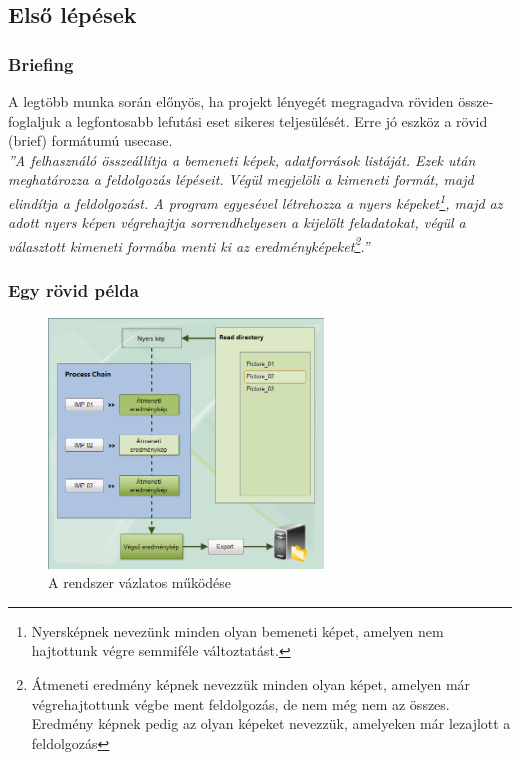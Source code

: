 \documentclass[a4paper,12pt,oneside]{report}
\begin{document}
\subsection{Első lépések}
\subsubsection{Briefing}
A legtöbb munka során előnyös, ha projekt lényegét megragadva röviden össze-foglaljuk a legfontosabb lefutási eset sikeres teljesülését. Erre jó eszköz a rövid (brief\cite{book:usecase_book_brief}) formátumú usecase.
\\\emph{''A felhasználó összeállítja a bemeneti képek, adatforrások listáját. Ezek után meghatározza a feldolgozás lépéseit. Végül megjelöli a kimeneti formát, majd elindítja a feldolgozást. A program egyesével létrehozza a nyers képeket\footnote{Nyersképnek nevezünk minden olyan bemeneti képet, amelyen nem hajtottunk végre semmiféle változtatást.}, majd az adott nyers képen végrehajtja sorrendhelyesen a kijelölt feladatokat, végül a választott kimeneti formába menti ki az eredményképeket\footnote{Átmeneti eredmény képnek nevezzük minden olyan képet, amelyen már végrehajtottunk végbe ment feldolgozás, de nem még nem az összes. Eredmény képnek pedig az olyan képeket nevezzük, amelyeken már lezajlott a feldolgozás}.''}

\subsubsection{Egy rövid példa}
\begin{figure}[h]
	\begin{center}
	  \includegraphics[width=0.650\textwidth]{read-dir-processing_IMP.jpg}
    \end{center}
	  \caption{A rendszer vázlatos működése}
	  \label{fig:bimg_usecase_brief}
\end{figure}
\end{document}
